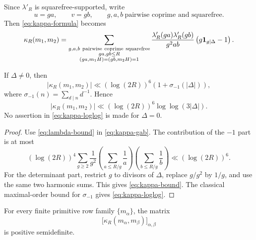 Since \(\lambda'_R\) is squarefree-supported, write
\begin{equation}
 u=ga,\qquad v=gb,\qquad g,a,b\ \text{pairwise coprime and squarefree}.
 \label{eq:model-gab}
\end{equation}
Then \eqref{eq:kappa-formula} becomes
\begin{align}
 \kappa_R(m_1,m_2)
 =\sum_{\substack{g,a,b\ \mathrm{pairwise\ coprime\ squarefree}\\
 ga,gb\le R\\(ga,m_1H)=(gb,m_2H)=1}}
 \frac{\lambda'_R(ga)\lambda'_R(gb)}{g^2ab}
 \left(g\mathbf 1_{g\mid\Delta}-1\right).
 \label{eq:kappa-gab}
\end{align}

\begin{corollary}
\label{cor:kappa-bound}
If \(\Delta\ne0\), then
\begin{equation}
 |\kappa_R(m_1,m_2)|
 \ll (\log(2R))^6
 \left(1+\sigma_{-1}(|\Delta|)\right),
 \label{eq:kappa-bound}
\end{equation}
where \(\sigma_{-1}(n)=\sum_{d\mid n}d^{-1}\).  Hence
\begin{equation}
 |\kappa_R(m_1,m_2)|
 \ll (\log(2R))^6\log\log(3|\Delta|).
 \label{eq:kappa-loglog}
\end{equation}
No assertion in \eqref{eq:kappa-loglog} is made for \(\Delta=0\).
\end{corollary}

\begin{proof}
Use \eqref{eq:lambda-bound} in \eqref{eq:kappa-gab}.  The contribution
of the \(-1\) part is at most
\[
 (\log(2R))^4
 \sum_{g\ge2}\frac1{g^2}
 \left(\sum_{a\le R/g}\frac1a\right)
 \left(\sum_{b\le R/g}\frac1b\right)
 \ll(\log(2R))^6.
\]
For the determinant part, restrict \(g\) to divisors of \(\Delta\),
replace \(g/g^2\) by \(1/g\), and use the same two harmonic sums.
This gives \eqref{eq:kappa-bound}.  The classical maximal-order bound
for \(\sigma_{-1}\) gives \eqref{eq:kappa-loglog}.
\end{proof}

\begin{proposition}
\label{prop:model-psd}
For every finite primitive row family \(\{m_\alpha\}\), the matrix
\begin{equation}
 \bigl[\kappa_R(m_\alpha,m_\beta)\bigr]_{\alpha,\beta}
 \label{eq:kappa-matrix}
\end{equation}
is positive semidefinite.
\end{proposition}

